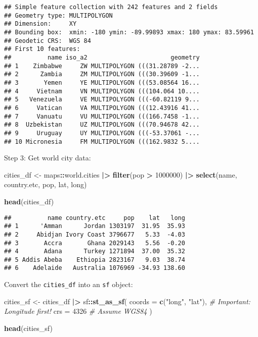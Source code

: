 \documentclass[
]{article}
\newenvironment{Shaded}{\begin{snugshade}}{\end{snugshade}}
\newcommand{\AttributeTok}[1]{\textcolor[rgb]{0.13,0.29,0.53}{#1}}
\newcommand{\CommentTok}[1]{\textcolor[rgb]{0.56,0.35,0.01}{\textit{#1}}}
\newcommand{\DecValTok}[1]{\textcolor[rgb]{0.00,0.00,0.81}{#1}}
\newcommand{\FunctionTok}[1]{\textcolor[rgb]{0.13,0.29,0.53}{\textbf{#1}}}
\newcommand{\NormalTok}[1]{#1}
\newcommand{\OtherTok}[1]{\textcolor[rgb]{0.56,0.35,0.01}{#1}}
\newcommand{\SpecialCharTok}[1]{\textcolor[rgb]{0.81,0.36,0.00}{\textbf{#1}}}
\newcommand{\StringTok}[1]{\textcolor[rgb]{0.31,0.60,0.02}{#1}}
\begin{document}
\begin{verbatim}
## Simple feature collection with 242 features and 2 fields
## Geometry type: MULTIPOLYGON
## Dimension:     XY
## Bounding box:  xmin: -180 ymin: -89.99893 xmax: 180 ymax: 83.59961
## Geodetic CRS:  WGS 84
## First 10 features:
##          name iso_a2                       geometry
## 1    Zimbabwe     ZW MULTIPOLYGON (((31.28789 -2...
## 2      Zambia     ZM MULTIPOLYGON (((30.39609 -1...
## 3       Yemen     YE MULTIPOLYGON (((53.08564 16...
## 4     Vietnam     VN MULTIPOLYGON (((104.064 10....
## 5   Venezuela     VE MULTIPOLYGON (((-60.82119 9...
## 6     Vatican     VA MULTIPOLYGON (((12.43916 41...
## 7     Vanuatu     VU MULTIPOLYGON (((166.7458 -1...
## 8  Uzbekistan     UZ MULTIPOLYGON (((70.94678 42...
## 9     Uruguay     UY MULTIPOLYGON (((-53.37061 -...
## 10 Micronesia     FM MULTIPOLYGON (((162.9832 5....
\end{verbatim}

Step 3: Get world city data:

\begin{Shaded}
\begin{Highlighting}[]
\NormalTok{cities\_df }\OtherTok{\textless{}{-}}\NormalTok{ maps}\SpecialCharTok{::}\NormalTok{world.cities }\SpecialCharTok{|\textgreater{}} 
  \FunctionTok{filter}\NormalTok{(pop }\SpecialCharTok{\textgreater{}} \DecValTok{1000000}\NormalTok{) }\SpecialCharTok{|\textgreater{}} 
  \FunctionTok{select}\NormalTok{(name, country.etc, pop, lat, long)}

\FunctionTok{head}\NormalTok{(cities\_df)}
\end{Highlighting}
\end{Shaded}

\begin{verbatim}
##          name country.etc     pop    lat   long
## 1      'Amman      Jordan 1303197  31.95  35.93
## 2     Abidjan Ivory Coast 3796677   5.33  -4.03
## 3       Accra       Ghana 2029143   5.56  -0.20
## 4       Adana      Turkey 1271894  37.00  35.32
## 5 Addis Abeba    Ethiopia 2823167   9.03  38.74
## 6    Adelaide   Australia 1076969 -34.93 138.60
\end{verbatim}

Convert the \texttt{cities\_df} into an \texttt{sf} object:

\begin{Shaded}
\begin{Highlighting}[]
\NormalTok{cities\_sf }\OtherTok{\textless{}{-}}\NormalTok{ cities\_df }\SpecialCharTok{|\textgreater{}} 
\NormalTok{  sf}\SpecialCharTok{::}\FunctionTok{st\_as\_sf}\NormalTok{(}
    \AttributeTok{coords =} \FunctionTok{c}\NormalTok{(}\StringTok{"long"}\NormalTok{, }\StringTok{"lat"}\NormalTok{), }\CommentTok{\# Important: Longitude first!}
    \AttributeTok{crs =} \DecValTok{4326} \CommentTok{\# Assume WGS84}
\NormalTok{  )}

\FunctionTok{head}\NormalTok{(cities\_sf)}
\end{Highlighting}
\end{Shaded}
\end{document}
